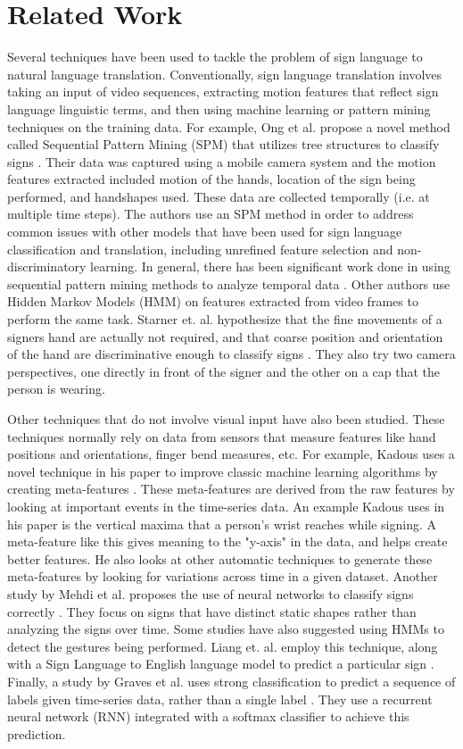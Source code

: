 \documentclass[twocolumn]{article}
\begin{document}
\section{Related Work}
Several techniques have been used to tackle the problem of sign language to natural language translation. Conventionally, sign language translation involves taking an input of video sequences, extracting motion features that reflect sign language linguistic terms, and then using machine learning or pattern mining techniques on the training data. For example, Ong et al. propose a novel method called Sequential Pattern Mining (SPM) that utilizes tree structures to classify signs \cite{ong2012sign}. Their data was captured using a mobile camera system and the motion features extracted included motion of the hands, location of the sign being performed, and handshapes used. These data are collected temporally (i.e. at multiple time steps). The authors use an SPM method in order to address common issues with other models that have been used for sign language classification and translation, including unrefined feature selection and non-discriminatory learning. In general, there has been significant work done in using sequential pattern mining methods to analyze temporal data \cite{ong2012sign}\cite{papapetrou2007}. Other authors use Hidden Markov Models (HMM) on features extracted from video frames to perform the same task. Starner et. al. hypothesize that the fine movements of a signers hand are actually not required, and that coarse position and orientation of the hand are discriminative enough to classify signs \cite{starner1998real}. They also try two camera perspectives, one directly in front of the signer and the other on a cap that the person is wearing. 

Other techniques that do not involve visual input have also been studied. These techniques normally rely on data from sensors that measure features like hand positions and orientations, finger bend measures, etc. For example, Kadous uses a novel technique in his paper to improve classic machine learning algorithms by creating meta-features \cite{kadous2002temporal}. These meta-features are derived from the raw features by looking at important events in the time-series data. An example Kadous uses in his paper is the vertical maxima that a person's wrist reaches while signing. A meta-feature like this gives meaning to the "y-axis" in the data, and helps create better features. He also looks at other automatic techniques to generate these meta-features by looking for variations across time in a given dataset. Another study by Mehdi et al. proposes the use of neural networks to classify signs correctly \cite{mehdi2002sign}. They focus on signs that have distinct static shapes rather than analyzing the signs over time. Some studies have also suggested using HMMs to detect the gestures being performed. Liang et. al. employ this technique, along with a Sign Language to English language model to predict a particular sign \cite{liang1998real}. Finally, a study by Graves et al. uses strong classification to predict a sequence of labels given time-series data, rather than a single label \cite{graves2006connectionist}. They use a recurrent neural network (RNN) integrated with a softmax classifier to achieve this prediction. 
\end{document}
